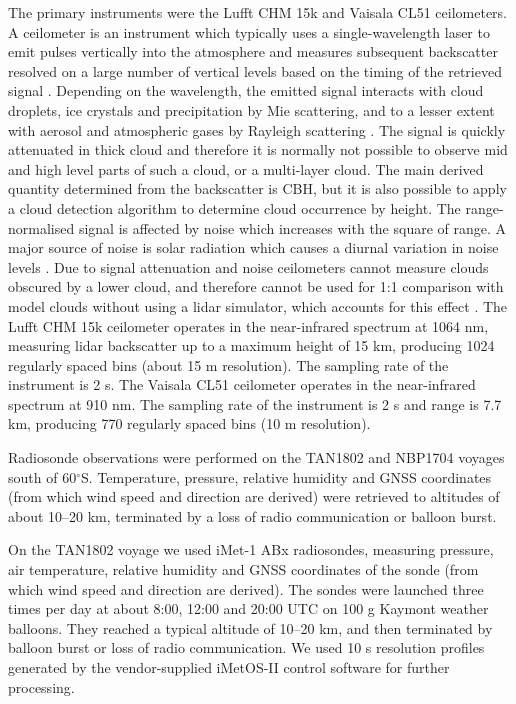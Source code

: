 The primary instruments were the Lufft CHM 15k and Vaisala CL51 ceilometers. A
ceilometer is an instrument which typically uses a single-wavelength laser to
emit pulses vertically into the atmosphere and measures subsequent backscatter
resolved on a large number of vertical levels based on the timing of the
retrieved signal \citep{emeis2010}. Depending on the wavelength, the emitted
signal interacts with cloud droplets, ice crystals and precipitation by Mie
scattering, and to a lesser extent with aerosol and atmospheric gases by
Rayleigh scattering \citep{bohren2008}. The signal is quickly attenuated in
thick cloud and therefore it is normally not possible to observe mid and high
level parts of such a cloud, or a multi-layer cloud. The main derived quantity
determined from the backscatter is CBH, but it is also possible to apply a cloud
detection algorithm to determine cloud occurrence by height. The
range-normalised signal is affected by noise which increases with the square of
range. A major source of noise is solar radiation which causes a diurnal
variation in noise levels \citep{kotthaus2016}. Due to signal attenuation and
noise ceilometers cannot measure clouds obscured by a lower cloud, and therefore
cannot be used for 1:1 comparison with model clouds without using a lidar
simulator, which accounts for this effect \citep{chepfer2008}. The Lufft CHM 15k
ceilometer operates in the near-infrared spectrum at 1064 nm, measuring lidar
backscatter up to a maximum height of 15 \unit{km}, producing 1024 regularly
spaced bins (about 15 m resolution). The sampling rate of the instrument is 2
\unit{s}. The Vaisala CL51 ceilometer operates in the near-infrared spectrum at
910 nm. The sampling rate of the instrument is 2 \unit{s} and range is 7.7
\unit{km}, producing 770 regularly spaced bins (10 m resolution).

Radiosonde observations were performed on the TAN1802 and NBP1704 voyages south
of 60$^\circ$S.  Temperature, pressure, relative humidity and GNSS coordinates
(from which wind speed and direction are derived) were retrieved to altitudes
of about 10--20 \unit{km}, terminated by a loss of radio communication or
balloon burst.

On the TAN1802 voyage we used iMet-1 ABx radiosondes, measuring pressure,
air temperature, relative humidity and GNSS coordinates of the sonde (from
which wind speed and direction are derived). The sondes were launched three
times per day at about 8:00, 12:00 and 20:00 UTC on 100 \unit{g} Kaymont
weather balloons.  They reached a typical altitude of 10--20 \unit{km}, and
then terminated by balloon burst or loss of radio communication. We used 10
\unit{s} resolution profiles generated by the vendor-supplied iMetOS-II control
software for further processing.

